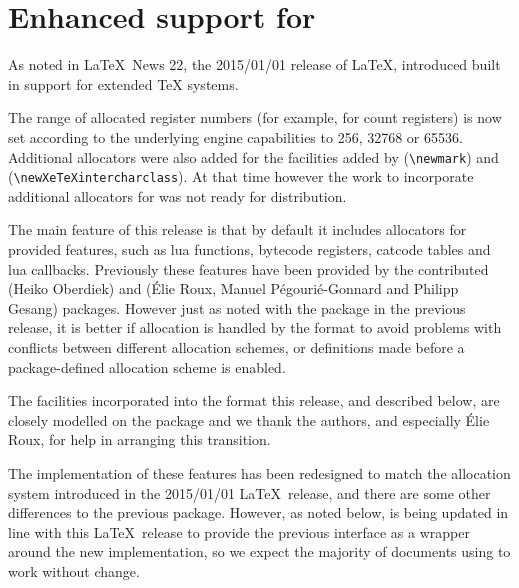 \documentclass{ltnews}
\begin{document}
\maketitle

\tableofcontents

\section{Enhanced support for }

As noted in \LaTeX\ News 22, the 2015/01/01 release of \LaTeX,
introduced built in support for extended TeX systems.

The range of allocated register numbers (for example, for count
registers) is now set according to the underlying engine capabilities
to 256, 32768 or 65536. Additional allocators were also added for the
facilities added by  (\verb|\newmark|) and 
(\verb|\newXeTeXintercharclass|). At that time however the work to
incorporate additional allocators for  was not ready for
distribution.

The main feature of this release is  that by default it includes
allocators for  provided features, such as lua
functions, bytecode registers, catcode tables and lua callbacks.
Previously these features have been provided by the contributed
 (Heiko Oberdiek) and 
(\'{E}lie Roux,
  Manuel P\'{e}gouri\'{e}-Gonnard and Philipp Gesang)
packages. However just as
noted with the  package in the previous release, it is
better if allocation is handled by the format to avoid problems with
conflicts between different allocation schemes, or definitions made
before a package-defined allocation scheme is enabled.

The facilities incorporated into the format this release, and
described below, are closely modelled on the 
package and we thank the authors, and especially \'{E}lie Roux, for
help in arranging this transition.

The implementation of these  features has been
redesigned to match the allocation system introduced in the 2015/01/01
\LaTeX\ release, and there are some other differences to the previous
 package. However, as noted below,
 is being updated in line with this \LaTeX\ release
to provide the previous interface as a wrapper around the new
implementation, so we expect the majority of documents using
 to work without change.
\end{document}
